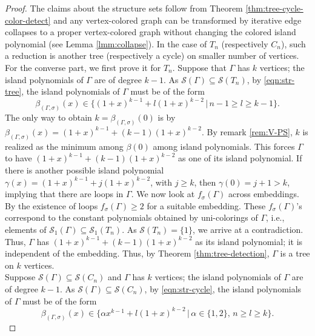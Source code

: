 \documentclass[10pt, reqno]{amsart}
\newcommand{\hf}{\hspace*{0.5cm}}
\theoremstyle{plain}
\theoremstyle{remark}
\theoremstyle{definition}
\numberwithin{equation}{section}
\begin{document}
\begin{proof}
The claims about the structure sets follow from Theorem \ref{thm:tree-cycle-color-detect} and any vertex-colored graph can be transformed by iterative edge collapses to a proper vertex-colored graph without changing the colored island polynomial (see Lemma \ref{lmm:collapse}). In the case of $T_n$ (respectively $C_n$), such a reduction is another tree (respectively a cycle) on smaller number of vertices. \\
\hf For the converse part, we first prove it for $T_n$. Suppose that $\Gamma$ has $k$ vertices; the island polynomials of $\Gamma$ are of degree $k-1$. As $\mathscr{S}(\Gamma)\subseteq \mathscr{S}(T_n)$, by \eqref{eqn:str-tree}, the island polynomials of $\Gamma$ must be of the form 
$$\beta_{(\Gamma,\sigma)}(x)\in \{(1+x)^{k-1}+l(1+x)^{k-2}\,|\,n-1\geq l\geq k-1\}.$$
The only way to obtain $k=\beta_{(\Gamma,\sigma)}(0)$ is by $\beta_{(\Gamma,\sigma)}(x)=(1+x)^{k-1}+(k-1)(1+x)^{k-2}$. By remark \ref{rem:V-PS}, $k$ is realized as the minimum among $\beta(0)$ among island polynomials. This forces $\Gamma$ to have $(1+x)^{k-1}+(k-1)(1+x)^{k-2}$ as one of its island polynomial. If there is another possible island polynomial $\gamma(x)=(1+x)^{k-1}+j(1+x)^{k-2}$, with $j\geq k$, then $\gamma(0)=j+1>k$, implying that there are loops in $\Gamma$. We now look at $f_\sigma(\Gamma)$ across embeddings. By the existence of loops $f_\sigma(\Gamma)\geq 2$ for a suitable embedding. These $f_\sigma(\Gamma)$'s correspond to the constant polynomials obtained by uni-colorings of $\Gamma$, i.e., elements of $\mathscr{S}_1(\Gamma)\subseteq \mathscr{S}_1(T_n)$. As $\mathscr{S}(T_n)=\{1\}$, we arrive at a contradiction. Thus, $\Gamma$ has $(1+x)^{k-1}+(k-1)(1+x)^{k-2}$ as its island polynomial; it is independent of the embedding. Thus, by Theorem \ref{thm:tree-detection}, $\Gamma$ is a tree on $k$ vertices.\\
\hf Suppose $\mathscr{S}(\Gamma)\subseteq \mathscr{S}(C_n)$ and $\Gamma$ has $k$ vertices; the island polynomials of $\Gamma$ are of degree $k-1$. As $\mathscr{S}(\Gamma)\subseteq \mathscr{S}(C_n)$, by \eqref{eqn:str-cycle}, the island polynomials of $\Gamma$ must be of the form 
$$\beta_{(\Gamma,\sigma)}(x)\in \{\alpha x^{k-1}+l(1+x)^{k-2}\,|\,\alpha\in\{1,2\},\,n\geq l\geq k\}.$$

\end{proof}
\end{document}
